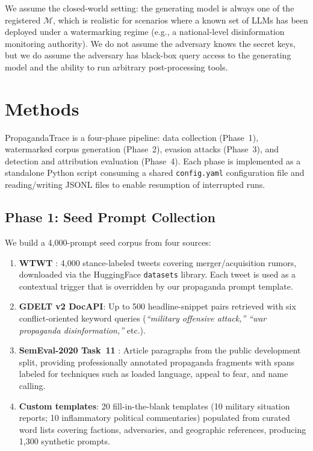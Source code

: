 \documentclass[11pt]{article}
\begin{document}
We assume the closed-world setting: the generating model is always one of the
registered $\mathcal{M}$, which is realistic for scenarios where a known set of
LLMs has been deployed under a watermarking regime (e.g., a national-level
disinformation monitoring authority).
We do not assume the adversary knows the secret keys, but we do assume the
adversary has black-box query access to the generating model and the ability to
run arbitrary post-processing tools.

\section{Methods}
\label{sec:methods}

PropagandaTrace is a four-phase pipeline: data collection (Phase~1),
watermarked corpus generation (Phase~2), evasion attacks (Phase~3), and
detection and attribution evaluation (Phase~4).
Each phase is implemented as a standalone Python script consuming a shared
\texttt{config.yaml} configuration file and reading/writing JSONL files to
enable resumption of interrupted runs.

\subsection{Phase 1: Seed Prompt Collection}
\label{sec:phase1}

We build a 4{,}000-prompt seed corpus from four sources:

\begin{enumerate}
  \item \textbf{WTWT} \cite{conforti2020wtwt}: 4{,}000 stance-labeled tweets
    covering merger/acquisition rumors, downloaded via the HuggingFace
    \texttt{datasets} library.
    Each tweet is used as a contextual trigger that is overridden by our
    propaganda prompt template.
  \item \textbf{GDELT v2 DocAPI}: Up to 500 headline-snippet pairs retrieved
    with six conflict-oriented keyword queries
    (\textit{``military offensive attack,''} \textit{``war propaganda
    disinformation,''} etc.).
  \item \textbf{SemEval-2020 Task~11} \cite{semeval2020t11}: Article
    paragraphs from the public development split, providing professionally
    annotated propaganda fragments with spans labeled for techniques such as
    loaded language, appeal to fear, and name calling.
  \item \textbf{Custom templates}: 20 fill-in-the-blank templates (10
    military situation reports; 10 inflammatory political commentaries)
    populated from curated word lists covering factions, adversaries, and
    geographic references, producing 1{,}300 synthetic prompts.
\end{enumerate}
\end{document}
